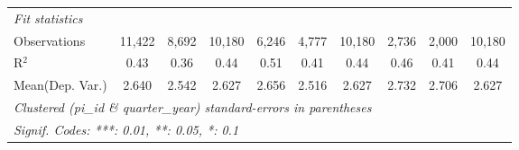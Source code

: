 \begin{tabular}{lccccccccc}
   \midrule
   \emph{Fit statistics}\\
   Observations                                                & 11,422        & 8,692         & 10,180        & 6,246        & 4,777        & 10,180        & 2,736        & 2,000   & 10,180\\  
   R$^2$                                                       & 0.43          & 0.36          & 0.44          & 0.51         & 0.41         & 0.44          & 0.46         & 0.41    & 0.44\\  
Mean(Dep. Var.) & 2.640 & 2.542 & 2.627 & 2.656 & 2.516 & 2.627 & 2.732 & 2.706 & 2.627 \\
   \midrule \midrule
   \multicolumn{10}{l}{\emph{Clustered (pi\_id \& quarter\_year) standard-errors in parentheses}}\\
   \multicolumn{10}{l}{\emph{Signif. Codes: ***: 0.01, **: 0.05, *: 0.1}}\\
\end{tabular}
\par\endgroup
